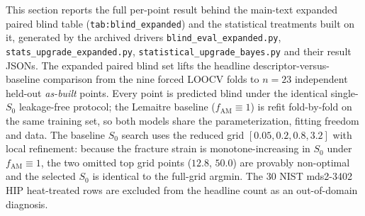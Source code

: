 \documentclass[11pt,a4paper,twocolumn]{article}
\begin{document}
This section reports the full per-point result behind the main-text expanded paired blind table
(\texttt{tab:blind\_expanded}) and the statistical treatments built on it, generated by the archived drivers
\texttt{blind\_eval\_expanded.py}, \texttt{stats\_upgrade\_expanded.py}, \texttt{statistical\_upgrade\_bayes.py} and their result JSONs. The expanded
paired blind set lifts the headline descriptor-versus-baseline comparison from the nine forced LOOCV folds
to $n = 23$ independent held-out \emph{as-built} points. Every point is predicted blind under the identical
single-$S_0$ leakage-free protocol; the Lemaitre baseline ($f_{\mathrm{AM}} \equiv 1$) is refit fold-by-fold on
the same training set, so both models share the parameterization, fitting freedom and data. The baseline $S_0$
search uses the reduced grid $[0.05, 0.2, 0.8, 3.2]$ with local refinement: because the fracture strain is
monotone-increasing in $S_0$ under $f_{\mathrm{AM}} \equiv 1$, the two omitted top grid points ($12.8$, $50.0$)
are provably non-optimal and the selected $S_0$ is identical to the full-grid argmin. The 30 NIST mds2-3402
HIP heat-treated rows are excluded from the headline count as an out-of-domain diagnosis.
\end{document}
